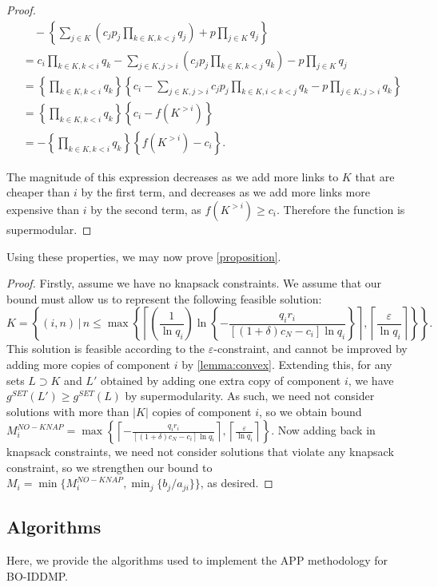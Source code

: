 \documentclass[11pt,authoryear,a4paper]{article}
\newcommand{\llceil}{\left\lceil}
\newcommand{\rrceil}{\right\rceil}
\theoremstyle{definition}
\begin{document}
\begin{proof}
\begin{align*}
    &\quad-\left\{\sum_{j\in K}\left( c_j p_j \prod_{k\in K, k<j}q_j\right) + p \prod_{j\in K}q_j\right\}\\
    &= c_i\prod_{k\in K, k < i}q_k - \sum_{j\in K, j > i}\left( c_j p_j \prod_{k\in K, k<j}q_k\right) - p\prod_{j\in K}q_j\\
    &= \left\{\prod_{k\in K, k < i}q_k\right\}\left\{ c_i - \sum_{j\in K, j > i}c_j p_j \prod_{k\in K, i < k < j}q_k - p\prod_{j\in K, j > i}q_k\right\}\\
    &= \left\{\prod_{k\in K, k < i}q_k\right\}\left\{c_i - f(K^{>i})\right\}\\
    &=-\left\{\prod_{k\in K, k < i}q_k\right\}\left\{f(K^{>i}) - c_i\right\}.
\end{align*}

The magnitude of this expression decreases as we add more links to $K$ that are cheaper than $i$ by the first term, and decreases as we add more links more expensive than $i$ by the second term, as $f(K^{>i}) \geq c_i$. Therefore the function is supermodular. 
\end{proof}

Using these properties, we may now prove \autoref{proposition}.

\begin{proof}
    Firstly, assume we have no knapsack constraints. We assume that our bound must allow us to represent the following feasible solution:
    $$K = \left\{(i,n)\,|\,n\leq\max\left\{\llceil\left(\frac{1}{\ln q_i}\right)\ln\left\{-\frac{q_ir_i}{[(1+\delta)c_N - c_i]\ln q_i}\right\}\rrceil,\llceil \frac{\varepsilon}{\ln q_i}\rrceil\right\}\right\}.$$
    This solution is feasible according to the $\varepsilon$-constraint, and cannot be improved by adding more copies of component $i$ by \autoref{lemma:convex}. Extending this, for any sets $L \supset K$ and $L'$ obtained by adding one extra copy of component $i$, we have $g^{SET}(L') \geq g^{SET}(L)$ by supermodularity. As such, we need not consider solutions with more than $|K|$ copies of component $i$, so we obtain bound $M^{NO-KNAP}_i = \max\left\{\llceil -\frac{q_ir_i}{[(1+\delta)c_N - c_i]\ln q_i} \rrceil,\llceil \frac{\varepsilon}{\ln q_i}\rrceil\right\}$. Now adding back in knapsack constraints, we need not consider solutions that violate any knapsack constraint, so we strengthen our bound to $M_i = \min\{M_i^{NO-KNAP}, \min_j\{b_j/a_{ji}\}\}$, as desired.
\end{proof}
\newpage
\subsection{Algorithms}
\label{sec:supp3:alg}
Here, we provide the algorithms used to implement the APP methodology for BO-IDDMP.
\end{document}
